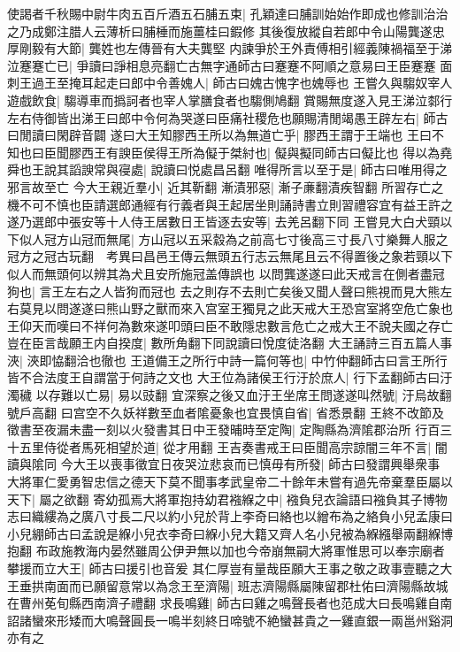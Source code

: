 使謁者千秋賜中尉牛肉五百斤酒五石脯五束|{
	孔穎達曰脯訓始始作即成也修訓治治之乃成鄭注腊人云薄析曰脯棰而施薑桂曰鍜修}
其後復放縱自若郎中令山陽龔遂忠厚剛毅有大節|{
	龔姓也左傳晉有大夫龔堅}
内諫爭於王外責傅相引經義陳禍福至于涕泣蹇蹇亡已|{
	爭讀曰諍相息亮翻亡古無字通師古曰蹇蹇不阿順之意易曰王臣蹇蹇}
面刺王過王至掩耳起走曰郎中令善媿人|{
	師古曰媿古愧字也媿辱也}
王嘗久與騶奴宰人遊戲飲食|{
	騶導車而撝訶者也宰人掌膳食者也騶側鳩翻}
賞賜無度遂入見王涕泣䣛行左右侍御皆出涕王曰郎中令何為哭遂曰臣痛社稷危也願賜清閒竭愚王辟左右|{
	師古曰閒讀曰閑辟音闢}
遂曰大王知膠西王所以為無道亡乎|{
	膠西王謂于王端也}
王曰不知也曰臣聞膠西王有諛臣侯得王所為儗于桀紂也|{
	儗與擬同師古曰儗比也}
得以為堯舜也王說其謟諛常與寑處|{
	說讀曰悦處昌呂翻}
唯得所言以至于是|{
	師古曰唯用得之邪言故至亡}
今大王親近羣小|{
	近其靳翻}
漸漬邪惡|{
	漸子亷翻漬疾智翻}
所習存亡之機不可不慎也臣請選郎通經有行義者與王起居坐則誦詩書立則習禮容宜有益王許之遂乃選郎中張安等十人侍王居數日王皆逐去安等|{
	去羌呂翻下同}
王嘗見大白犬頸以下似人冠方山冠而無尾|{
	方山冠以五采縠為之前高七寸後高三寸長八寸樂舞人服之冠方之冠古玩翻　考異曰昌邑王傳云無頭五行志云無尾且云不得置後之象若頸以下似人而無頭何以辨其為犬且安所施冠盖傳誤也}
以問龔遂遂曰此天戒言在側者盡冠狗也|{
	言王左右之人皆狗而冠也}
去之則存不去則亡矣後又聞人聲曰熊視而見大熊左右莫見以問遂遂曰熊山野之獸而來入宫室王獨見之此天戒大王恐宫室將空危亡象也王仰天而嘆曰不祥何為數來遂叩頭曰臣不敢隱忠數言危亡之戒大王不說夫國之存亡豈在臣言哉願王内自揆度|{
	數所角翻下同說讀曰悅度徒洛翻}
大王誦詩三百五篇人事浹|{
	浹即恊翻洽也徹也}
王道備王之所行中詩一篇何等也|{
	中竹仲翻師古曰言王所行皆不合法度王自謂當于何詩之文也}
大王位為諸侯王行汙於庶人|{
	行下孟翻師古曰汙濁穢}
以存難以亡易|{
	易以豉翻}
宜深察之後又血汙王坐席王問遂遂叫然號|{
	汙烏故翻號戶高翻}
曰宫空不久妖祥數至血者隂憂象也宜畏慎自省|{
	省悉景翻}
王終不改節及徵書至夜漏未盡一刻以火發書其日中王發晡時至定陶|{
	定陶縣為濟隂郡治所}
行百三十五里侍從者馬死相望於道|{
	從才用翻}
王吉奏書戒王曰臣聞高宗諒闇三年不言|{
	闇讀與隂同}
今大王以喪事徵宜日夜哭泣悲哀而已慎毋有所發|{
	師古曰發謂興舉衆事}
大將軍仁愛勇智忠信之德天下莫不聞事孝武皇帝二十餘年未嘗有過先帝棄羣臣屬以天下|{
	屬之欲翻}
寄幼孤焉大將軍抱持幼君襁緥之中|{
	襁負兒衣論語曰襁負其子博物志曰織縷為之廣八寸長二尺以約小兒於背上李奇曰絡也以繒布為之絡負小兒孟康曰小兒綳師古曰孟說是緥小兒衣李奇曰緥小兒大籍又齊人名小兒被為緥繦舉兩翻緥博抱翻}
布政施教海内晏然雖周公伊尹無以加也今帝崩無嗣大將軍惟思可以奉宗廟者攀援而立大王|{
	師古曰援引也音爰}
其仁厚豈有量哉臣願大王事之敬之政事壹聽之大王垂拱南面而已願留意常以為念王至濟陽|{
	班志濟陽縣屬陳留郡杜佑曰濟陽縣故城在曹州莬旬縣西南濟子禮翻}
求長鳴雞|{
	師古曰雞之鳴聲長者也范成大曰長鳴雞自南詔諸蠻來形矮而大鳴聲圓長一鳴半刻終日啼號不絶蠻甚貴之一雞直銀一兩邕州谿洞亦有之}
